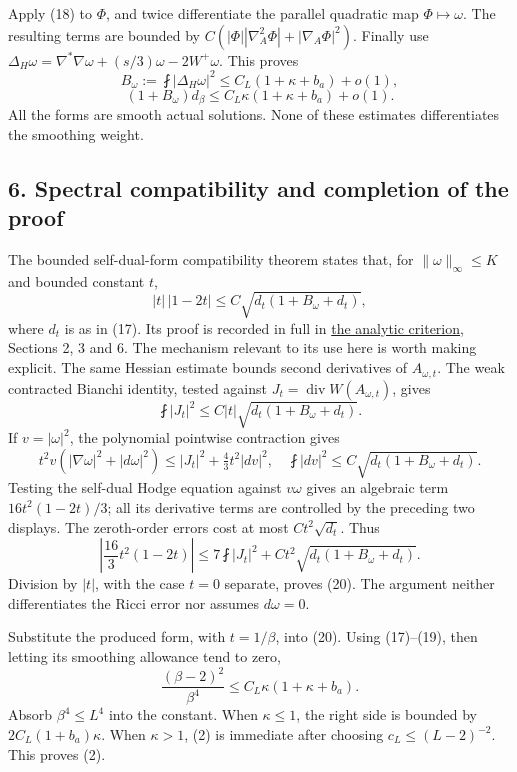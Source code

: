 \documentclass[
  10pt,
]{article}
\begin{document}
Apply (18) to \(\Phi\), and twice differentiate the parallel quadratic
map \(\Phi\mapsto\omega\). The resulting terms are bounded by
\(C(|\Phi||\nabla_A^2\Phi|+|\nabla_A\Phi|^2)\). Finally use
\(\Delta_H\omega=\nabla^*\nabla\omega+(s/3)\omega-2W^+\omega\). This
proves \[
B_\omega:=\fint|\Delta_H\omega|^2
\le C_L(1+\kappa+b_a)+o(1),
\] \[
\boxed{(1+B_\omega)d_\beta
\le C_L\kappa(1+\kappa+b_a)+o(1).}
\tag{19}
\] All the forms are smooth actual solutions. None of these estimates
differentiates the smoothing weight.

\hypertarget{spectral-compatibility-and-completion-of-the-proof}{%
\subsection{6. Spectral compatibility and completion of the
proof}\label{spectral-compatibility-and-completion-of-the-proof}}

The bounded self-dual-form compatibility theorem states that, for
\(\|\omega\|_\infty\le K\) and bounded constant \(t\), \[
|t|\,|1-2t|
\le C\sqrt{d_t(1+B_\omega+d_t)},
\tag{20}
\] where \(d_t\) is as in (17). Its proof is recorded in full in
\href{round21_analytic.md}{the analytic criterion}, Sections 2, 3 and 6.
The mechanism relevant to its use here is worth making explicit. The
same Hessian estimate bounds second derivatives of \(A_{\omega,t}\). The
weak contracted Bianchi identity, tested against
\(J_t=\operatorname{div}W(A_{\omega,t})\), gives \[
\fint|J_t|^2\le C|t|\sqrt{d_t(1+B_\omega+d_t)}.
\] If \(v=|\omega|^2\), the polynomial pointwise contraction gives \[
t^2v(|\nabla\omega|^2+|d\omega|^2)
\le |J_t|^2+\tfrac43t^2|dv|^2,
\quad
\fint|dv|^2\le C\sqrt{d_t(1+B_\omega+d_t)}.
\] Testing the self-dual Hodge equation against \(v\omega\) gives an
algebraic term \(16t^2(1-2t)/3\); all its derivative terms are
controlled by the preceding two displays. The zeroth-order errors cost
at most \(Ct^2\sqrt{d_t}\). Thus \[
\left|\frac{16}{3}t^2(1-2t)\right|
\le7\fint|J_t|^2+C t^2\sqrt{d_t(1+B_\omega+d_t)}.
\] Division by \(|t|\), with the case \(t=0\) separate, proves (20). The
argument neither differentiates the Ricci error nor assumes
\(d\omega=0\).

Substitute the produced form, with \(t=1/\beta\), into (20). Using
(17)--(19), then letting its smoothing allowance tend to zero, \[
\frac{(\beta-2)^2}{\beta^4}
\le C_L\kappa(1+\kappa+b_a).
\tag{21}
\] Absorb \(\beta^4\le L^4\) into the constant. When \(\kappa\le1\), the
right side is bounded by \(2C_L(1+b_a)\kappa\). When \(\kappa>1\), (2)
is immediate after choosing \(c_L\le(L-2)^{-2}\). This proves (2).
\end{document}
